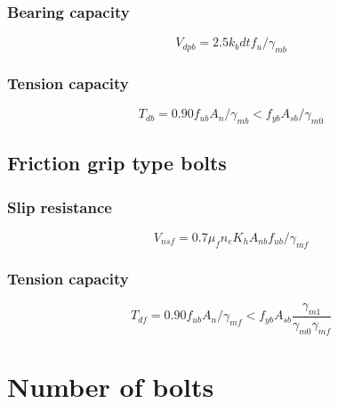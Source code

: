 \documentclass[11.5pt,a4paper,oneside]{report}
\begin{document}
\begin{Form}
\subsubsection{Bearing capacity}
\begin{equation}
V_{dpb} = 2.5 k_b d t f_u / \gamma_{mb}
\end{equation}
\subsubsection{Tension capacity}
\begin{equation}
T_{db} = 0.90 f_{ub} A_n / \gamma_{mb} < f_{yb} A_{sb} / \gamma_{m0}
\end{equation}
\subsection{Friction grip type bolts}
\subsubsection{Slip resistance}
\begin{equation}
V_{nsf} = 0.7 \mu_f n_e  K_h A_{nb} f_{ub} / \gamma_{mf}
\end{equation}
\subsubsection{Tension capacity}
\begin{equation}
T_{df} = 0.90 f_{ub} A_n / \gamma_{mf} < f_{yb} A_{sb}  \frac{\gamma_{m1}}{\gamma_{m0} \gamma_{mf}}
\end{equation}
\section{Number of bolts}

\end{Form}
\end{document}
